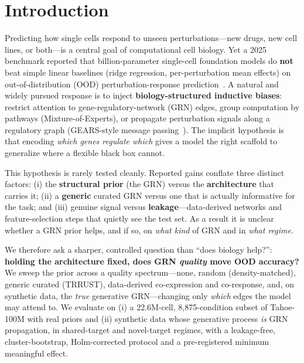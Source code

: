 \documentclass[11pt]{article}
\begin{document}
\section{Introduction}
Predicting how single cells respond to unseen perturbations---new drugs, new cell lines, or both---is a
central goal of computational cell biology. Yet a 2025 benchmark reported that billion-parameter
single-cell foundation models do \textbf{not} beat simple linear baselines (ridge regression,
per-perturbation mean effects) on out-of-distribution (OOD) perturbation-response
prediction~\cite{nm2025benchmark}. A natural and widely pursued response is to inject
\textbf{biology-structured inductive biases}: restrict attention to gene-regulatory-network (GRN) edges,
group computation by pathways (Mixture-of-Experts), or propagate perturbation signals along a regulatory
graph (GEARS-style message passing~\cite{gears}). The implicit hypothesis is that encoding \emph{which
genes regulate which} gives a model the right scaffold to generalize where a flexible black box cannot.

This hypothesis is rarely tested cleanly. Reported gains conflate three distinct factors: (i) the
\textbf{structural prior} (the GRN) versus the \textbf{architecture} that carries it; (ii) a
\textbf{generic} curated GRN versus one that is actually informative for the task; and (iii) genuine
signal versus \textbf{leakage}---data-derived networks and feature-selection steps that quietly see the
test set. As a result it is unclear whether a GRN prior helps, and if so, on \emph{what kind} of GRN and
in \emph{what regime}.

We therefore ask a sharper, controlled question than ``does biology help?'': \textbf{holding the
architecture fixed, does GRN \emph{quality} move OOD accuracy?} We sweep the prior across a quality
spectrum---none, random (density-matched), generic curated (TRRUST), data-derived co-expression and
co-response, and, on synthetic data, the \emph{true} generative GRN---changing only \emph{which} edges
the model may attend to. We evaluate on (i) a 22.6M-cell, 8{,}875-condition subset of Tahoe-100M with
real priors and (ii) synthetic data whose generative process \emph{is} GRN propagation, in shared-target
and novel-target regimes, with a leakage-free, cluster-bootstrap, Holm-corrected protocol and a
pre-registered minimum meaningful effect.
\end{document}
